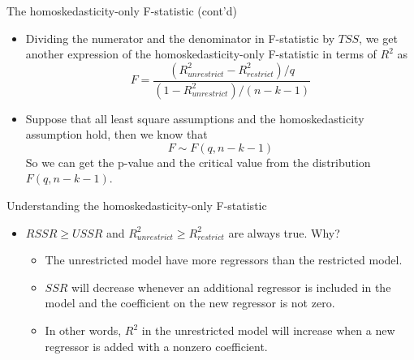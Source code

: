 \documentclass[presentation,10pt]{beamer}
\begin{document}
\begin{frame}[label={sec:org879c39e}]{The homoskedasticity-only F-statistic (cont'd)}
\begin{itemize}
\item Dividing the numerator and the denominator in F-statistic by \(TSS\),
we get another expression of the homoskedasticity-only F-statistic
in terms of \(R^2\) as
\begin{equation}
\label{eq:ftest-hm-r}
F = \frac{(R^2_{unrestrict} - R^2_{restrict})/q}{(1 - R^2_{unrestrict})/(n-k-1)}
\end{equation}

\item Suppose that all least square assumptions and the homoskedasticity
assumption hold, then we know that
\[ F \sim F(q, n-k-1) \]
So we can get the p-value and the critical value from the
distribution \(F(q, n-k-1)\).
\end{itemize}
\end{frame}

\begin{frame}[label={sec:org616b6f2}]{Understanding the homoskedasticity-only F-statistic}
\begin{itemize}
\item \(RSSR \geq USSR\) and \(R^2_{unrestrict} \geq R^2_{restrict}\)
are always true. Why?

\begin{itemize}
\item The unrestricted model have more regressors than the restricted
model.

\vspace{0.2cm}

\item \(SSR\) will decrease whenever an additional regressor is included
in the model and the coefficient on the new regressor is not
zero.

\vspace{0.2cm}

\item In other words, \(R^2\) in the unrestricted model will increase when
a new regressor is added with a nonzero coefficient.
\end{itemize}
\end{itemize}
\end{frame}
\end{document}
